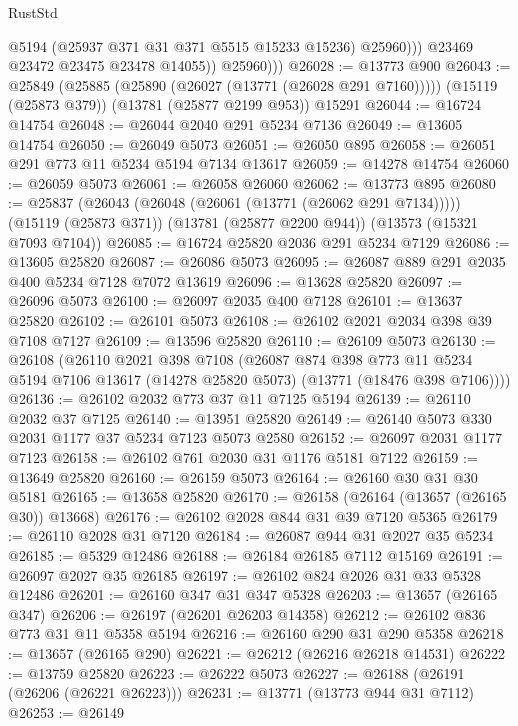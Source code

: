 \begin{lexlean}{RustStd}
\begin{coremodule}
                    @5194
                    (@25937 @371 @31 @371 @5515 @15233 @15236)
                    @25960)))
              @23469
              @23472
              @23475
              @23478
              @14055))
          @25960)))
@26028 := @13773 @900
@26043 := @25849
    (@25885 (@25890 (@26027 (@13771 (@26028 @291 @7160)))))
    (@15119 (@25873 @379))
    (@13781 (@25877 @2199 @953))
    @15291
@26044 := @16724 @14754
@26048 := @26044 @2040 @291 @5234 @7136
@26049 := @13605 @14754
@26050 := @26049 @5073
@26051 := @26050 @895
@26058 := @26051 @291 @773 @11 @5234 @5194 @7134 @13617
@26059 := @14278 @14754
@26060 := @26059 @5073
@26061 := @26058 @26060
@26062 := @13773 @895
@26080 := @25837
    (@26043 (@26048 (@26061 (@13771 (@26062 @291 @7134)))))
    (@15119 (@25873 @371))
    (@13781 (@25877 @2200 @944))
    (@13573 (@15321 @7093 @7104))
@26085 := @16724 @25820 @2036 @291 @5234 @7129
@26086 := @13605 @25820
@26087 := @26086 @5073
@26095 := @26087 @889 @291 @2035 @400 @5234 @7128 @7072 @13619
@26096 := @13628 @25820
@26097 := @26096 @5073
@26100 := @26097 @2035 @400 @7128
@26101 := @13637 @25820
@26102 := @26101 @5073
@26108 := @26102 @2021 @2034 @398 @39 @7108 @7127
@26109 := @13596 @25820
@26110 := @26109 @5073
@26130 := @26108
    (@26110
      @2021
      @398
      @7108
      (@26087
        @874
        @398
        @773
        @11
        @5234
        @5194
        @7106
        @13617
        (@14278 @25820 @5073)
        (@13771 (@18476 @398 @7106))))
@26136 := @26102 @2032 @773 @37 @11 @7125 @5194
@26139 := @26110 @2032 @37 @7125
@26140 := @13951 @25820
@26149 := @26140 @5073 @330 @2031 @1177 @37 @5234 @7123 @5073 @2580
@26152 := @26097 @2031 @1177 @7123
@26158 := @26102 @761 @2030 @31 @1176 @5181 @7122
@26159 := @13649 @25820
@26160 := @26159 @5073
@26164 := @26160 @30 @31 @30 @5181
@26165 := @13658 @25820
@26170 := @26158 (@26164 (@13657 (@26165 @30)) @13668)
@26176 := @26102 @2028 @844 @31 @39 @7120 @5365
@26179 := @26110 @2028 @31 @7120
@26184 := @26087 @944 @31 @2027 @35 @5234
@26185 := @5329 @12486
@26188 := @26184 @26185 @7112 @15169
@26191 := @26097 @2027 @35 @26185
@26197 := @26102 @824 @2026 @31 @33 @5328 @12486
@26201 := @26160 @347 @31 @347 @5328
@26203 := @13657 (@26165 @347)
@26206 := @26197 (@26201 @26203 @14358)
@26212 := @26102 @836 @773 @31 @11 @5358 @5194
@26216 := @26160 @290 @31 @290 @5358
@26218 := @13657 (@26165 @290)
@26221 := @26212 (@26216 @26218 @14531)
@26222 := @13759 @25820
@26223 := @26222 @5073
@26227 := @26188 (@26191 (@26206 (@26221 @26223)))
@26231 := @13771 (@13773 @944 @31 @7112)
@26253 := @26149

\end{coremodule}
\end{lexlean}
